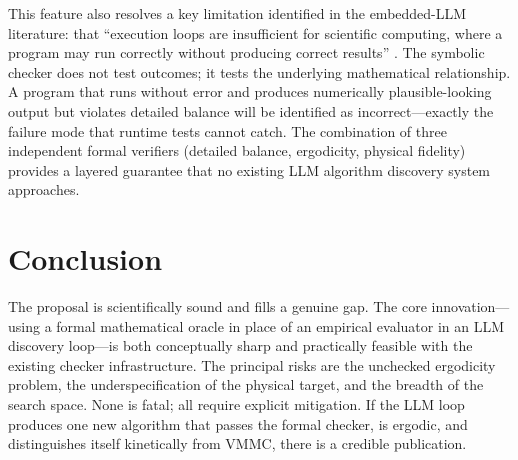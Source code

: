 \documentclass[10.5pt]{article}
\begin{document}
This feature also resolves a key limitation identified in the embedded-LLM
literature: that ``execution loops are insufficient for scientific
computing, where a program may run correctly without producing correct
results'' \cite{llmloop2025}.  The symbolic checker does not test
outcomes; it tests the underlying mathematical relationship.  A program
that runs without error and produces numerically plausible-looking output
but violates detailed balance will be identified as incorrect---exactly
the failure mode that runtime tests cannot catch.  The combination of
three independent formal verifiers (detailed balance, ergodicity,
physical fidelity) provides a layered guarantee that no existing LLM
algorithm discovery system approaches.

\section{Conclusion}

The proposal is scientifically sound and fills a genuine gap.  The core
innovation---using a formal mathematical oracle in place of an empirical evaluator
in an LLM discovery loop---is both conceptually sharp and practically feasible with
the existing checker infrastructure.  The principal risks are the unchecked
ergodicity problem, the underspecification of the physical target, and the breadth
of the search space.  None is fatal; all require explicit mitigation.  If the LLM
loop produces one new algorithm that passes the formal checker, is ergodic, and
distinguishes itself kinetically from VMMC, there is a credible publication.
\end{document}
